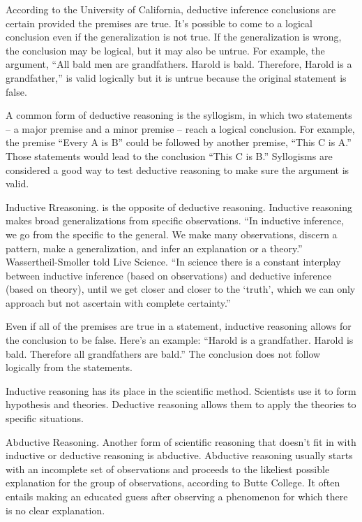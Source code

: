 According to the University of California, deductive inference conclusions are certain provided the premises are true. It’s possible to come to a logical conclusion even if the generalization is not true. If the generalization is wrong, the conclusion may be logical, but it may also be untrue. For example, the argument, ``All bald men are grandfathers. Harold is bald. Therefore, Harold is a grandfather,'' is valid logically but it is untrue because the original statement is false.

A common form of deductive reasoning is the syllogism, in which two statements – a major premise and a minor premise – reach a logical conclusion. For example, the premise ``Every A is B'' could be followed by another premise, ``This C is A.''  Those statements would lead to the conclusion ``This C is B.'' Syllogisms are considered a good way to test deductive reasoning to make sure the argument is valid.

Inductive Rreasoning. is the opposite of deductive reasoning. Inductive reasoning makes broad generalizations from specific observations. ``In inductive inference, we go from the specific to the general. We make many observations, discern a pattern, make a generalization, and infer an explanation or a theory.'' Wassertheil-Smoller told Live Science. ``In science there is a constant interplay between inductive inference (based on observations) and deductive inference (based on theory), until we get closer and closer to the `truth', which we can only approach but not ascertain with complete certainty.''

Even if all of the premises are true in a statement, inductive reasoning allows for the conclusion to be false. Here’s an example: ``Harold is a grandfather. Harold is bald. Therefore all grandfathers are bald.''  The conclusion does not follow logically from the statements.

Inductive reasoning has its place in the scientific method. Scientists use it to form hypothesis and theories. Deductive reasoning allows them to apply the theories to specific situations.

Abductive Reasoning. Another form of scientific reasoning that doesn’t fit in with inductive or deductive reasoning is abductive. Abductive reasoning usually starts with an incomplete set of observations and proceeds to the likeliest possible explanation for the group of observations, according to Butte College. It often entails making an educated guess after observing a phenomenon for which there is no clear explanation.

